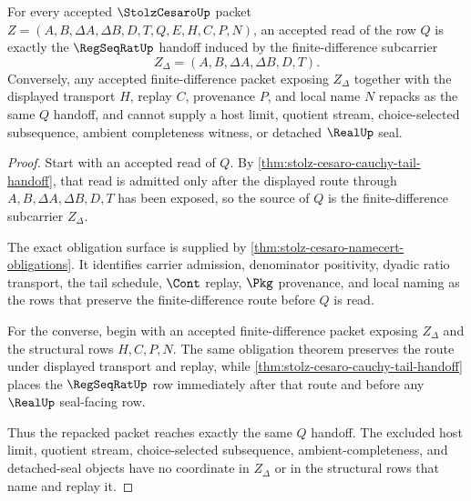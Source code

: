 \begin{theorem}\label{thm:stolz-cesaro-regseqrat-handoff}
For every accepted $\StolzCesaroUp$ packet $Z=(A,B,\Delta A,\Delta B,D,T,Q,E,H,C,P,N)$, an accepted read of the row $Q$ is exactly the $\RegSeqRatUp$ handoff induced by the finite-difference subcarrier
$$
Z_{\Delta}=(A,B,\Delta A,\Delta B,D,T).
$$
Conversely, any accepted finite-difference packet exposing $Z_{\Delta}$ together with the displayed transport $H$, replay $C$, provenance $P$, and local name $N$ repacks as the same $Q$ handoff, and cannot supply a host limit, quotient stream, choice-selected subsequence, ambient completeness witness, or detached $\RealUp$ seal.
\end{theorem}
\begin{proof}
Start with an accepted read of $Q$. By \autoref{thm:stolz-cesaro-cauchy-tail-handoff}, that read is admitted only after the displayed route through $A,B,\Delta A,\Delta B,D,T$ has been exposed, so the source of $Q$ is the finite-difference subcarrier $Z_{\Delta}$.

The exact obligation surface is supplied by \autoref{thm:stolz-cesaro-namecert-obligations}. It identifies carrier admission, denominator positivity, dyadic ratio transport, the tail schedule, $\Cont$ replay, $\Pkg$ provenance, and local naming as the rows that preserve the finite-difference route before $Q$ is read.

For the converse, begin with an accepted finite-difference packet exposing $Z_{\Delta}$ and the structural rows $H,C,P,N$. The same obligation theorem preserves the route under displayed transport and replay, while \autoref{thm:stolz-cesaro-cauchy-tail-handoff} places the $\RegSeqRatUp$ row immediately after that route and before any $\RealUp$ seal-facing row.

Thus the repacked packet reaches exactly the same $Q$ handoff. The excluded host limit, quotient stream, choice-selected subsequence, ambient-completeness, and detached-seal objects have no coordinate in $Z_{\Delta}$ or in the structural rows that name and replay it.
\end{proof}

